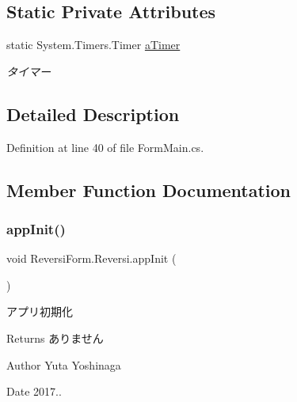 \subsection*{Static Private Attributes}
\begin{DoxyCompactItemize}
\item 
\mbox{\label{class_reversi_form_1_1_reversi_ad0c066a95e298cbe146aed56e2ca8545}} 
static System.\+Timers.\+Timer \hyperlink{class_reversi_form_1_1_reversi_ad0c066a95e298cbe146aed56e2ca8545}{a\+Timer}
\begin{DoxyCompactList}\small\item\em タイマー \end{DoxyCompactList}\end{DoxyCompactItemize}


\subsection{Detailed Description}


Definition at line 40 of file Form\+Main.\+cs.



\subsection{Member Function Documentation}
\mbox{\label{class_reversi_form_1_1_reversi_aab2e35051cbff2f184ee7e76ae60846d}} 
\subsubsection{\texorpdfstring{app\+Init()}{appInit()}}
{\footnotesize\ttfamily void Reversi\+Form.\+Reversi.\+app\+Init (\begin{DoxyParamCaption}{ }\end{DoxyParamCaption})}



アプリ初期化 

\begin{DoxyReturn}{Returns}
ありません 
\end{DoxyReturn}
\begin{DoxyAuthor}{Author}
Yuta Yoshinaga 
\end{DoxyAuthor}
\begin{DoxyDate}{Date}
2017.. 
\end{DoxyDate}



